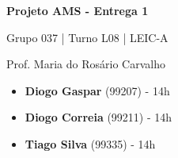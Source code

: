 \documentclass[12pt,a4paper]{article}
\begin{document}
\begin{titlepage}
  \begin{center}
    \vspace*{5cm}

    \Huge
    \textbf{Projeto AMS - Entrega 1}

    \vspace{0.5cm}
    \LARGE
    Grupo 037 | Turno L08 | LEIC-A

    \vspace{0.5cm}
    \large
    Prof. Maria do Rosário Carvalho

    \vfill
  \end{center}
  \large
  \begin{itemize}
    \item[] \textbf{Diogo Gaspar} (99207) - 14h
    \item[] \textbf{Diogo Correia} (99211) - 14h
    \item[] \textbf{Tiago Silva} (99335) - 14h
  \end{itemize}
\end{titlepage}

\begin{landscape}
  \begin{center}
    
  \end{center}
\end{landscape}

\begin{landscape}
  \begin{center}
    
  \end{center}
\end{landscape}

\begin{landscape}
  \begin{center}
    
  \end{center}
\end{landscape}
\end{document}
